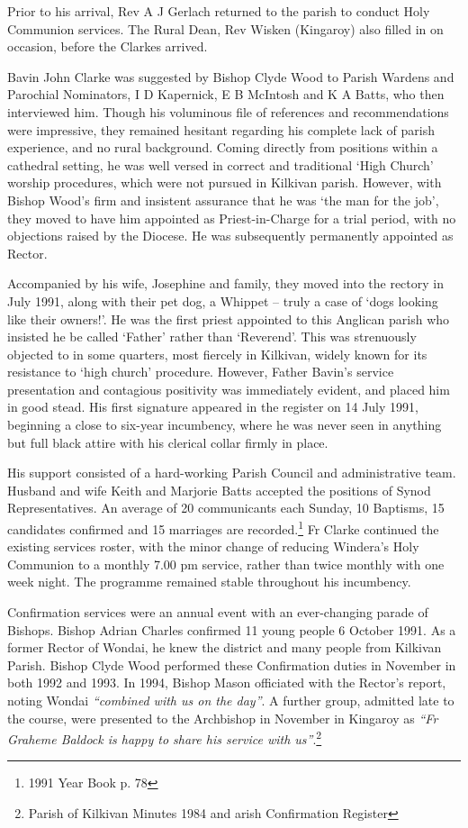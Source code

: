 Prior to his arrival, Rev A J Gerlach returned to the parish to conduct Holy Communion services. The Rural Dean, Rev Wisken (Kingaroy) also filled in on occasion, before the Clarkes arrived.



Bavin John Clarke was suggested by Bishop Clyde Wood to Parish Wardens and Parochial Nominators, I D Kapernick, E B McIntosh and K A Batts, who then interviewed him. Though his voluminous file of references and recommendations were impressive, they remained hesitant regarding his complete lack of parish experience, and no rural background. Coming directly from positions within a cathedral setting, he was well versed in correct and traditional `High Church' worship procedures, which were not pursued in Kilkivan parish. However, with Bishop Wood's firm and insistent assurance that he was `the man for the job', they moved to have him appointed as Priest-in-Charge for a trial period, with no objections raised by the Diocese. He was subsequently permanently appointed as Rector.



Accompanied by his wife, Josephine and family, they moved into the rectory in July 1991, along with their pet dog, a Whippet -- truly a case of `dogs looking like their owners!'. He was the first priest appointed to this Anglican parish who insisted he be called `Father' rather than `Reverend'. This was strenuously objected to in some quarters, most fiercely in Kilkivan, widely known for its resistance to `high church' procedure. However, Father Bavin's service presentation and contagious positivity was immediately evident, and placed him in good stead. His first signature appeared in the register on 14 July 1991, beginning a close to six-year incumbency, where he was never seen in anything but full black attire with his clerical collar firmly in place.



His support consisted of a hard-working Parish Council and administrative team. Husband and wife Keith and Marjorie Batts accepted the positions of Synod Representatives. An average of 20 communicants each Sunday, 10 Baptisms, 15 candidates confirmed and 15 marriages are recorded.\footnote{1991 Year Book p. 78} Fr Clarke continued the existing services roster, with the minor change of reducing Windera's Holy Communion to a monthly 7.00 pm service, rather than twice monthly with one week night. The programme remained stable throughout his incumbency.


Confirmation services were an annual event with an ever-changing parade of Bishops. Bishop Adrian Charles confirmed 11 young people 6 October 1991. As a former Rector of Wondai, he knew the district and many people from Kilkivan Parish. Bishop Clyde Wood performed these Confirmation duties in November in both 1992 and 1993. In 1994, Bishop Mason officiated with the Rector's report, noting Wondai \emph{``combined with us on the day''}. A further group, admitted late to the course, were presented to the Archbishop in November in Kingaroy as \emph{``Fr Graheme Baldock is happy to share his service with us''}.\footnote{Parish of Kilkivan Minutes 1984 and arish Confirmation Register}


